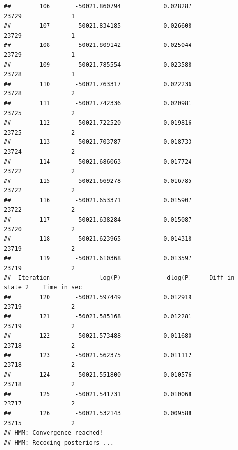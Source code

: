 \documentclass[11pt]{article}\usepackage[]{graphicx}\usepackage[]{color}
\makeatletter
\newenvironment{kframe}{%
 \def\at@end@of@kframe{}%
 \ifinner\ifhmode%
  \def\at@end@of@kframe{\end{minipage}}%
  \begin{minipage}{\columnwidth}%
 \fi\fi%
 \def\FrameCommand##1{\hskip\@totalleftmargin \hskip-\fboxsep
 \colorbox{shadecolor}{##1}\hskip-\fboxsep
     \hskip-\linewidth \hskip-\@totalleftmargin \hskip\columnwidth}%
 \MakeFramed {\advance\hsize-\width
   \@totalleftmargin\z@ \linewidth\hsize
   \@setminipage}}%
 {\par\unskip\endMakeFramed%
 \at@end@of@kframe}
\newenvironment{knitrout}{}{} %
\makeatother
\begin{document}
\begin{scriptsize}
\begin{knitrout}
\begin{kframe}
\begin{verbatim}
##        106       -50021.860794            0.028287               23729              1
##        107       -50021.834185            0.026608               23729              1
##        108       -50021.809142            0.025044               23729              1
##        109       -50021.785554            0.023588               23728              1
##        110       -50021.763317            0.022236               23728              2
##        111       -50021.742336            0.020981               23725              2
##        112       -50021.722520            0.019816               23725              2
##        113       -50021.703787            0.018733               23724              2
##        114       -50021.686063            0.017724               23722              2
##        115       -50021.669278            0.016785               23722              2
##        116       -50021.653371            0.015907               23722              2
##        117       -50021.638284            0.015087               23720              2
##        118       -50021.623965            0.014318               23719              2
##        119       -50021.610368            0.013597               23719              2
##  Iteration              log(P)             dlog(P)     Diff in state 2    Time in sec
##        120       -50021.597449            0.012919               23719              2
##        121       -50021.585168            0.012281               23719              2
##        122       -50021.573488            0.011680               23718              2
##        123       -50021.562375            0.011112               23718              2
##        124       -50021.551800            0.010576               23718              2
##        125       -50021.541731            0.010068               23717              2
##        126       -50021.532143            0.009588               23715              2
## HMM: Convergence reached!
## HMM: Recoding posteriors ...
\end{verbatim}


{\ttfamily\noindent\itshape\color{messagecolor}{\#\# Calculating states from posteriors ... 0.24s\\\#\# Making segmentation ... 0.44s}}\end{kframe}
\end{knitrout}


\end{scriptsize}
\end{document}
